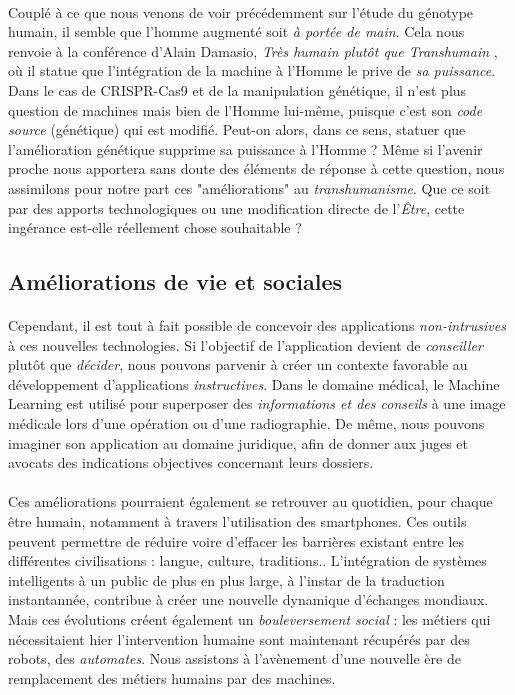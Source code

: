 \paragraph{} Couplé à ce que nous venons de voir précédemment sur l'étude du génotype humain, il semble que
l'homme augmenté soit \emph{à portée de main}. Cela nous renvoie à la conférence d'Alain Damasio, \emph{Très humain
plutôt que Transhumain} \cite{Damasio2}, où il statue que l'intégration de la machine à l'Homme le prive de \emph{sa 
puissance}. Dans le cas de CRISPR-Cas9 et de la manipulation génétique, il n'est plus question de machines
mais bien de l'Homme lui-même, puisque c'est son \emph{code source} (génétique) qui est modifié. Peut-on alors, dans ce sens,
statuer que l'amélioration génétique supprime sa puissance à l'Homme ? Même si l'avenir proche nous apportera sans doute
des éléments de réponse à cette question, nous assimilons pour notre part ces "améliorations" au \emph{transhumanisme}.
Que ce soit par des apports technologiques ou une modification directe de l'\emph{Être}, cette ingérance est-elle
réellement chose souhaitable ?


\subsection*{Améliorations de vie et sociales}

\paragraph{} Cependant, il est tout à fait possible de concevoir des applications \emph{non-intrusives} à ces
nouvelles technologies. Si l'objectif de l'application devient de \emph{conseiller} plutôt que \emph{décider},
nous pouvons parvenir à créer un contexte favorable au développement d'applications \emph{instructives}. Dans le
domaine médical, le Machine Learning est utilisé pour superposer des \emph{informations et des conseils} à
une image médicale lors d'une opération ou d'une radiographie. De même, nous pouvons imaginer son 
application au domaine juridique, afin de donner aux juges et avocats des indications objectives concernant leurs
dossiers.

\paragraph{} Ces améliorations pourraient également se retrouver au quotidien, pour chaque être humain, notamment
à travers l'utilisation des smartphones. Ces outils peuvent permettre de réduire voire d'effacer les barrières 
existant entre les différentes civilisations : langue, culture, traditions.. L'intégration de systèmes intelligents 
à un public de plus en plus large, à l'instar de la traduction instantannée, contribue à créer une nouvelle
dynamique d'échanges mondiaux. Mais ces évolutions créent également un \emph{bouleversement social} : les métiers
qui nécessitaient hier l'intervention humaine sont maintenant récupérés par des robots, des \emph{automates}.
Nous assistons à l'avènement d'une nouvelle ère de remplacement des métiers humains par des machines.

